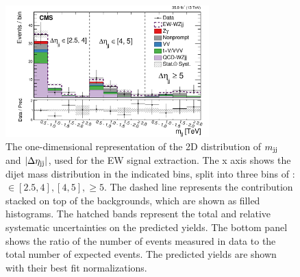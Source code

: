 \begin{figure}[htbp]
  \centering
   \includegraphics[width=0.7\textwidth]{figures/AnalysisResults/mjj_etajj_unrolled.pdf}
    \caption{
      The one-dimensional representation of the 2D distribution of 
      $m_{\mathrm{jj}}$ and $\left|\Delta\eta_{\mathrm{jj}}\right|$, used for the EW 
      signal extraction. The x axis shows the dijet mass distribution
      in the indicated bins, split into three bins of {\etajj }: {\etajj} $\in [2.5, 4], [4, 5], \ge 5$.
      The dashed line represents the \EWWZ contribution stacked
      on top of the backgrounds, which are shown as filled histograms. 
      The hatched bands represent the total and relative 
      systematic uncertainties on the predicted yields.
      The bottom panel shows the ratio of the number of events measured in data to the total 
      number of expected events. 
      The predicted yields are shown with their best fit normalizations.
    }
  \label{fig:2DfitDistribution}
\end{figure}

